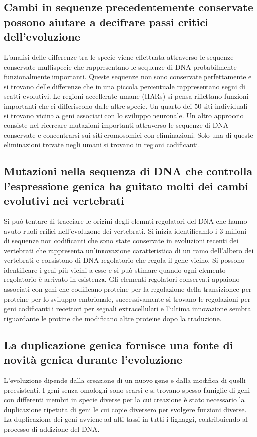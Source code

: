 \subsection{Cambi in sequenze precedentemente conservate possono aiutare a decifrare passi critici dell'evoluzione}
L'analisi delle differenze tra le specie viene effettuata attraverso le sequenze conservate multispecie che rappresentano le sequenze di DNA probabilmente funzionalmente importanti. 
Queste sequenze non sono conservate perfettamente e si trovano delle differenze che in una piccola percentuale rappresentano segni di scatti evolutivi. Le regioni accellerate umane
(HARs) si pensa riflettano funzioni importanti che ci differiscono dalle altre specie. Un quarto dei $50$ siti individuali si trovano vicino a geni associati con lo sviluppo neuronale. 
Un altro approccio consiste nel ricercare mutazioni importanti attraverso le sequenze di DNA conservate e concentrarsi sui siti cromosomici con eliminazioni. Solo una di queste 
eliminazioni trovate negli umani si trovano in regioni codificanti. 
\subsection{Mutazioni nella sequenza di DNA che controlla l'espressione genica ha guitato molti dei cambi evolutivi nei vertebrati}
Si pu\`o tentare di tracciare le origini degli elemnti regolatori del DNA che hanno avuto ruoli crifici nell'evoluzone dei vertebrati. Si inizia identificando i $3$ milioni di sequenze
non codificanti che sono state conservate in evoluzioni recenti dei vertebrati che rappresenta un'innovazione caratteristica di un ramo dell'albero dei vertebrati e consistono di DNA
regolatorio che regola il gene vicino. Si possono identificare i geni pi\`u vicini a esse e si pu\`o stimare quando ogni elemento regolatorio \`e arrivato in esistenza. Gli elementi 
regolatori conservati appaiono associati con geni che codificano proteine per la regolazione della transizionee per proteine per lo sviluppo embrionale, successivamente si trovano le
regolazioni per geni codificanti i recettori per segnali extracellulari e l'ultima innovazione sembra riguardante le protine che modificano altre proteine dopo la traduzione. 
\subsection{La duplicazione genica fornisce una fonte di novit\`a genica durante l'evoluzione}
L'evoluzione dipende dalla creazione di un nuovo gene e dalla modifica di quelli preesistenti. I geni senza omologhi sono scarsi e si trovano spesso famiglie di geni con differenti 
membri in specie diverse per la cui creazione \`e stato necessario la duplicazione ripetuta di geni le cui copie diversero per svolgere funzioni diverse. La  duplicazione dei geni 
avviene ad alti tassi in tutti i lignaggi, contribuiendo al processo di addizione del DNA. 
